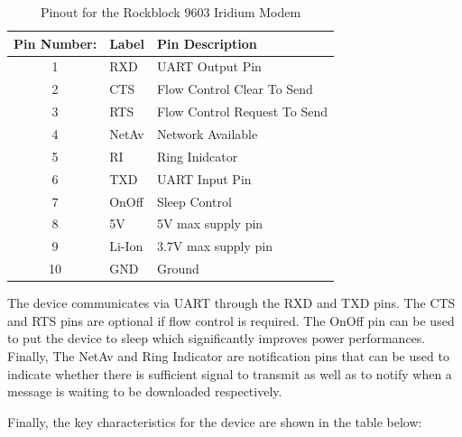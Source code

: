 \begin{table}[H]
	\centering
	\caption{Pinout for the Rockblock 9603 Iridium Modem}
	\begin{tabular}{c l l}
		\hline
		Pin Number: & Label & Pin Description\\
		\hline
		\hline
		1 & RXD & UART Output Pin \\
		
		2 & CTS & Flow Control Clear To Send\\
		3 & RTS & Flow Control Request To Send\\
		4 & NetAv & Network Available \\
		5 & RI & Ring Inidcator \\
		6 & TXD & UART Input Pin \\
		7 & OnOff & Sleep Control\\
		8 & 5V & 5V max supply pin \\
		9 & Li-Ion & 3.7V max supply pin \\
		10 & GND & Ground \\
		\hline
		\hline
	\end{tabular}
	
	\label{tab:ir_pinout}
\end{table}

The device communicates via UART through the RXD and TXD pins. The CTS and RTS pins are optional if flow control is required. The OnOff pin can be used to put the device to sleep which significantly improves power performances. Finally, The NetAv and Ring Indicator are notification pins that can be used to indicate whether there is sufficient signal to transmit as well as to notify when a message is waiting to be downloaded respectively. 

Finally, the key characteristics for the device are shown in the table below:

